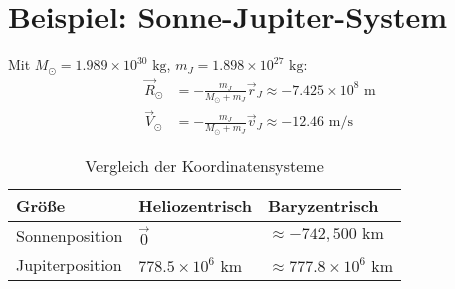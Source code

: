 \section{Beispiel: Sonne-Jupiter-System}

Mit $ M_\odot = 1.989 \times 10^{30} \text{ kg} $, $ m_J = 1.898 \times 10^{27} \text{ kg} $:
\begin{align}
\vec{R}_\odot &= -\frac{m_J}{M_\odot + m_J} \vec{r}_J \approx -7.425 \times 10^8 \text{ m} \\
\vec{V}_\odot &= -\frac{m_J}{M_\odot + m_J} \vec{v}_J \approx -12.46 \text{ m/s}
\end{align}

\begin{table}[H]
    \centering
    \begin{tabular}{lll}
        \toprule
        Größe & Heliozentrisch & Baryzentrisch \\
        \midrule
        Sonnenposition & $\vec{0}$ & $\approx -742,500 \text{ km}$ \\
        Jupiterposition & $778.5 \times 10^6 \text{ km}$ & $\approx 777.8 \times 10^6 \text{ km}$ \\
        \bottomrule
    \end{tabular}
    \caption{Vergleich der Koordinatensysteme}
\end{table}